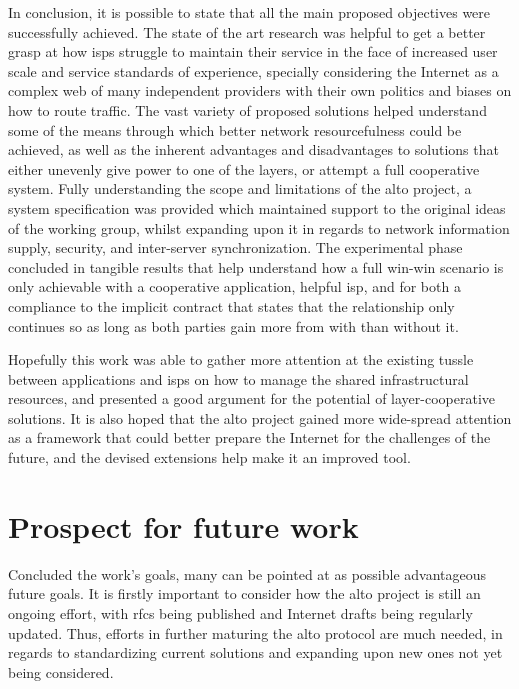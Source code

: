     In conclusion, it is possible to state that all the main proposed objectives were successfully achieved.
    The state of the art research was helpful to get a better grasp at how \glspl{isp} struggle to maintain their service in the face of increased user scale and service standards of experience, specially considering the Internet as a complex web of many independent providers with their own politics and biases on how to route traffic.
    The vast variety of proposed solutions helped understand some of the means through which better network resourcefulness could be achieved, as well as the inherent advantages and disadvantages to solutions that either unevenly give power to one of the layers, or attempt a full cooperative system.
    Fully understanding the scope and limitations of the \gls{alto} project, a system specification was provided which maintained support to the original ideas of the working group, whilst expanding upon it in regards to network information supply, security, and inter-server synchronization.
    The experimental phase concluded in tangible results that help understand how a full win-win scenario is only achievable with a cooperative application, helpful \gls{isp}, and for both a compliance to the implicit contract that states that the relationship only continues so as long as both parties gain more from with than without it.

    Hopefully this work was able to gather more attention at the existing tussle between applications and \glspl{isp} on how to manage the shared infrastructural resources, and presented a good argument for the potential of layer-cooperative solutions.
    It is also hoped that the \gls{alto} project gained more wide-spread attention as a framework that could better prepare the Internet for the challenges of the future, and the devised extensions help make it an improved tool.

\section{Prospect for future work}

    Concluded the work's goals, many can be pointed at as possible advantageous future goals.
    It is firstly important to consider how the \gls{alto} project is still an ongoing effort, with \glspl{rfc} being published and Internet drafts being regularly updated.
    Thus, efforts in further maturing the \gls{alto} protocol are much needed, in regards to standardizing current solutions and expanding upon new ones not yet being considered.

